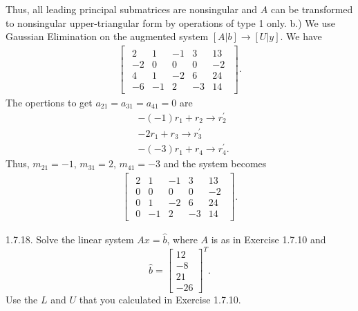 \documentclass{report}
\begin{document}
    Thus, all leading principal submatrices are nonsingular and $A$ can be transformed to nonsingular upper-triangular form by operations of type 1 only.
    \bigbreak \noindent 
    b.) We use Gaussian Elimination on the augmented system $[A|b] \to [U|y]$. We have
    \begin{align*}
        \begin{bmatrix}
            \begin{array}{cccc|c}
                2 & 1 & -1 & 3 & 13\\
                -2 & 0 & 0 & 0 & -2\\
                4 & 1 & -2 & 6 & 24\\
                -6 & -1 & 2 & -3 &14
            \end{array}
        \end{bmatrix}
    .\end{align*}
    The opertions to get $a_{21} = a_{31} = a_{41} = 0$ are
    \begin{align*}
        &-(-1)r_{1} + r_{2} \to r_{2}^{\prime} \\
        &-2r_{1} + r_{3} \to r_{3}^{\prime} \\
        &-(-3)r_{1} + r_{4} \to r_{4}^{\prime}
    .\end{align*}
    Thus, $m_{21} = -1$, $m_{31} = 2$, $m_{41} = -3$ and the system becomes
    \begin{align*}
        \begin{bmatrix}
            \begin{array}{cccc|c}
                2 & 1 & -1 & 3 & 13\\
                0 & 0 & 0 & 0 & -2\\
                0 & 1 & -2 & 6 & 24\\
                0 & -1 & 2 & -3 &14
            \end{array}
        \end{bmatrix}
    .\end{align*}

    
    

    \bigbreak \noindent 
    \begin{mdframed}
        1.7.18. Solve the linear system $A x = \hat{b}$, where $A$ is as in Exercise 1.7.10 and 
        \[
            \hat{b} = 
            \begin{bmatrix}
                12 \\
                -8 \\
                21 \\
                -26
            \end{bmatrix}^{T}.
        \]
        Use the $L$ and $U$ that you calculated in Exercise 1.7.10.
    \end{mdframed}
\end{document}
